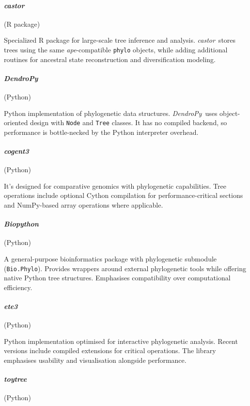 \documentclass[11pt, a4paper]{article}
\newcommand{\ape}{\textit{ape}}
\newcommand{\dendropy}{\textit{DendroPy}}
\newcommand{\cogent}{\textit{cogent3}}
\newcommand{\biopython}{\textit{Biopython}}
\newcommand{\ete}{\textit{ete3}}
\newcommand{\toytree}{\textit{toytree}}
\newcommand{\castor}{\textit{castor}}
\begin{document}
\paragraph{\castor} (R package)

Specialized R package for large-scale tree inference and analysis. \castor\ stores trees using the same \ape-compatible \texttt{phylo} objects, while adding additional routines for ancestral state reconstruction and diversification modeling.

\paragraph{\dendropy} (Python)

Python implementation of phylogenetic data structures. \dendropy\ uses object-oriented design with \texttt{Node} and \texttt{Tree} classes. It has no compiled backend, so performance is bottle-necked by the Python interpreter overhead.

\paragraph{\cogent} (Python)

It's designed for comparative genomics with phylogenetic capabilities. Tree operations include optional Cython compilation for performance-critical sections and NumPy-based array operations where applicable.


\paragraph{\biopython} (Python)

A general-purpose bioinformatics package with phylogenetic submodule (\texttt{Bio.Phylo}). Provides wrappers around external phylogenetic tools while offering native Python tree structures. Emphasises compatibility over computational efficiency.

\paragraph{\ete} (Python)

Python implementation optimised for interactive phylogenetic analysis. Recent versions include compiled extensions for critical operations. The library emphasises usability and visualisation alongside performance.

\paragraph{\toytree} (Python)
\end{document}
